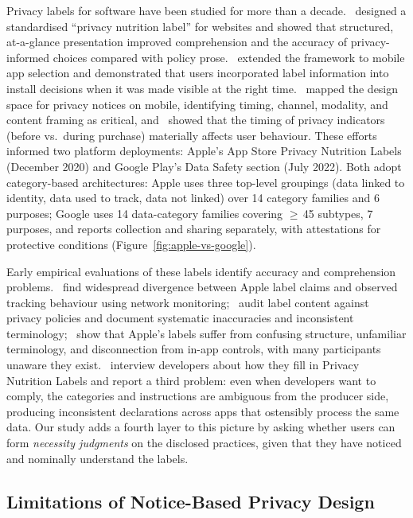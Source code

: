 \documentclass[11pt,a4paper]{article}
\begin{document}
Privacy labels for software have been studied for more than a
decade.~\citet{kelley:etal:2009,kelley:etal:2010} designed a standardised
``privacy nutrition label'' for websites and showed that structured,
at-a-glance presentation improved comprehension and the accuracy of
privacy-informed choices compared with policy
prose.~\citet{kelley:etal:2013} extended the framework to mobile app
selection and demonstrated that users incorporated label information
into install decisions when it was made visible at the right
time.~\citet{schaub:etal:2015} mapped the design space for privacy
notices on mobile, identifying timing, channel, modality, and content
framing as critical, and~\citet{egelman:etal:2009} showed that the
timing of privacy indicators (before vs.\ during purchase) materially
affects user behaviour. These efforts informed two platform deployments:
Apple's App Store Privacy Nutrition Labels (December 2020) and Google
Play's Data Safety section (July 2022). Both adopt category-based
architectures: Apple uses three top-level groupings (data linked to
identity, data used to track, data not linked) over 14 category families
and 6 purposes; Google uses 14 data-category families covering
$\geq$\,45 subtypes, 7 purposes, and reports collection and sharing
separately, with attestations for protective conditions
(Figure~\ref{fig:apple-vs-google}).

Early empirical evaluations of these labels identify accuracy and
comprehension problems.~\citet{kollnig:etal:2022} find widespread
divergence between Apple label claims and observed tracking behaviour
using network monitoring;~\citet{koch:etal:2022} audit label content
against privacy policies and document systematic inaccuracies and
inconsistent terminology;~\citet{zhang:etal:2022} show that Apple's
labels suffer from confusing structure, unfamiliar terminology, and
disconnection from in-app controls, with many participants unaware they
exist.~\citet{bhagavatula:etal:2023} interview developers about how
they fill in Privacy Nutrition Labels and report a third problem: even
when developers want to comply, the categories and instructions are
ambiguous from the producer side, producing inconsistent declarations
across apps that ostensibly process the same data. Our study adds a
fourth layer to this picture by asking whether users can form
\emph{necessity judgments} on the disclosed practices, given that they
have noticed and nominally understand the labels.

\subsection{Limitations of Notice-Based Privacy Design}
\label{subsec:rw-notice}
\end{document}
